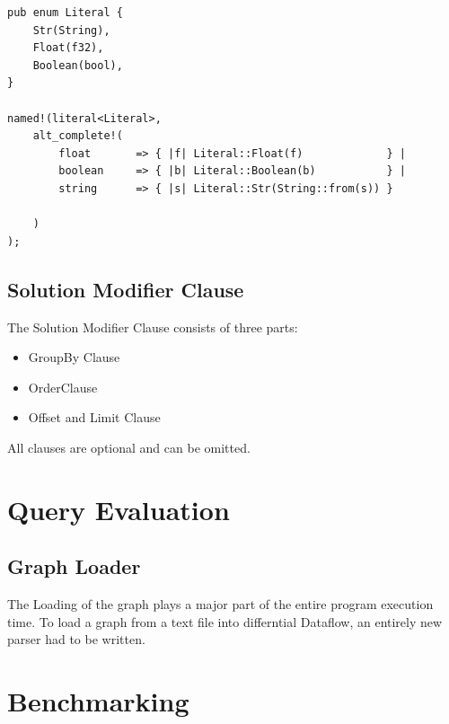 \documentclass[11pt,singlecolumn]{scrartcl}
\begin{document}
 \begin{lstlisting}
pub enum Literal {
    Str(String),
    Float(f32),
    Boolean(bool),
} 
 
named!(literal<Literal>,
    alt_complete!(
        float       => { |f| Literal::Float(f)             } |
        boolean     => { |b| Literal::Boolean(b)           } |
        string      => { |s| Literal::Str(String::from(s)) } 
            
    )
);
 \end{lstlisting}
 
 \clearpage
 
 \subsection{Solution Modifier Clause}
 
 The Solution Modifier Clause consists of three parts: 
  \begin{itemize} 
\item GroupBy Clause
\item OrderClause
\item Offset and Limit Clause
\end{itemize}
 All clauses are optional and can be omitted. 
 
\clearpage

\section{Query Evaluation}

\subsection{Graph Loader}
The Loading of the graph plays a major part of the entire program execution time. To load a graph from a text file into differntial Dataflow, an entirely new parser had to be written.
 
\clearpage

\section{Benchmarking}

\clearpage
\end{document}
